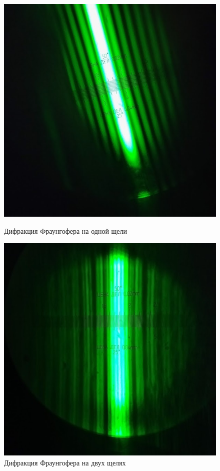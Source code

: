 \documentclass[a4paper]{article}
\begin{document}
\begin{figure}[h]
\begin{center}
\begin{minipage}[h]{0.45\linewidth}
\includegraphics[width=1\linewidth]{frauh_1.jpg}
\caption{Дифракция Фраунгофера на одной щели} %
\label{ris:experimoriginal} %
\end{minipage}
\hfill 
\begin{minipage}[h]{0.45\linewidth}
\includegraphics[width=1\linewidth]{frauh_2.jpg}
\caption{Дифракция Фраунгофера на двух щелях}
\label{ris:experimcoded}
\end{minipage}
\end{center}
\end{figure}
\end{document}
